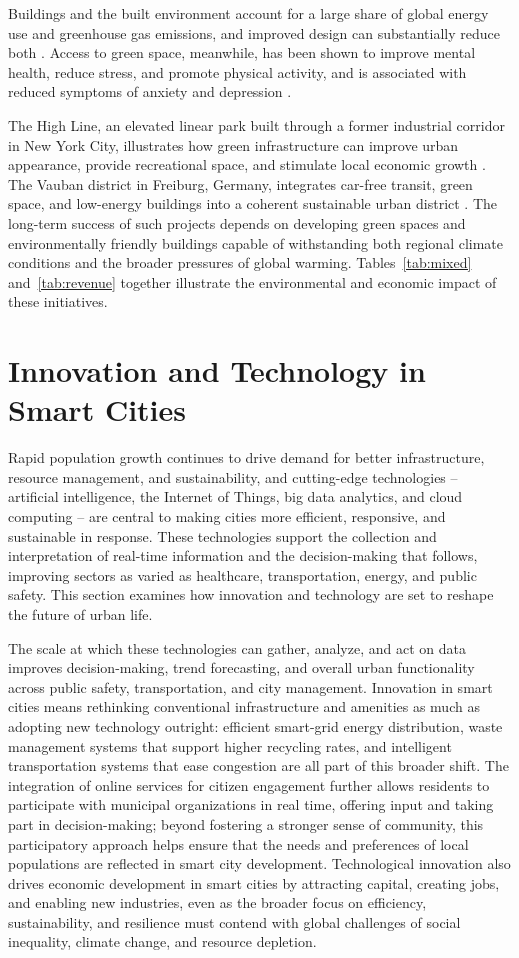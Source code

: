 \documentclass[journal]{IEEEtran}
\begin{document}
Buildings and the built environment account for a large share of global energy use and greenhouse gas emissions, and improved design can substantially reduce both \cite{r64}. Access to green space, meanwhile, has been shown to improve mental health, reduce stress, and promote physical activity, and is associated with reduced symptoms of anxiety and depression \cite{r65}.

The High Line, an elevated linear park built through a former industrial corridor in New York City, illustrates how green infrastructure can improve urban appearance, provide recreational space, and stimulate local economic growth \cite{r66}. The Vauban district in Freiburg, Germany, integrates car-free transit, green space, and low-energy buildings into a coherent sustainable urban district \cite{r67}. The long-term success of such projects depends on developing green spaces and environmentally friendly buildings capable of withstanding both regional climate conditions and the broader pressures of global warming. Tables~\ref{tab:mixed} and~\ref{tab:revenue} together illustrate the environmental and economic impact of these initiatives.

\section{Innovation and Technology in Smart Cities}
Rapid population growth continues to drive demand for better infrastructure, resource management, and sustainability, and cutting-edge technologies -- artificial intelligence, the Internet of Things, big data analytics, and cloud computing -- are central to making cities more efficient, responsive, and sustainable in response. These technologies support the collection and interpretation of real-time information and the decision-making that follows, improving sectors as varied as healthcare, transportation, energy, and public safety. This section examines how innovation and technology are set to reshape the future of urban life.

The scale at which these technologies can gather, analyze, and act on data improves decision-making, trend forecasting, and overall urban functionality across public safety, transportation, and city management. Innovation in smart cities means rethinking conventional infrastructure and amenities as much as adopting new technology outright: efficient smart-grid energy distribution, waste management systems that support higher recycling rates, and intelligent transportation systems that ease congestion are all part of this broader shift. The integration of online services for citizen engagement further allows residents to participate with municipal organizations in real time, offering input and taking part in decision-making; beyond fostering a stronger sense of community, this participatory approach helps ensure that the needs and preferences of local populations are reflected in smart city development. Technological innovation also drives economic development in smart cities by attracting capital, creating jobs, and enabling new industries, even as the broader focus on efficiency, sustainability, and resilience must contend with global challenges of social inequality, climate change, and resource depletion.
\end{document}
